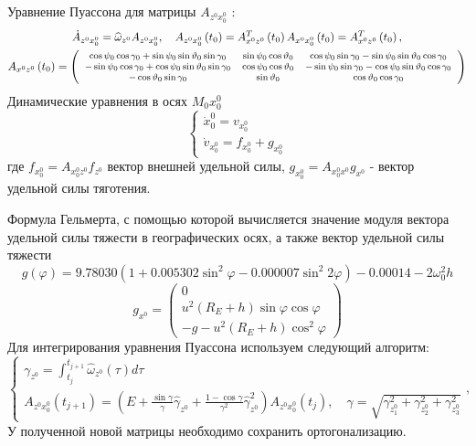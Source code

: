 \documentclass[a4paper,14pt]{article}
\theoremstyle{plain} %
\theoremstyle{definition} %
\theoremstyle{remark} %
\begin{document}
{Уравнение Пуассона для матрицы $A_{z^{0} x_{0}^{0}}$ :
$$
    \begin{gathered}
        \dot{A}_{z^{0} x_{0}^{0}}=\widehat{\omega}_{z^{0}} A_{z^{0} x_{0}^{0}}, \quad A_{z^{0} x_{0}^{0}}\left(t_{0}\right)=A^{T}_{x^{0} z^{0}}\left(t_{0}\right) A_{x^{0} x_{0}^{0}}\left(t_{0}\right)=A^{T}_{x^{0} z^{0}}\left(t_{0}\right), \\
        {\footnotesize
        A_{x^{0} z^{0}}\left(t_{0}\right)=\left(\begin{array}{ccc}
                \cos \psi_{0} \cos \gamma_{0}+\sin \psi_{0} \sin \vartheta_{0} \sin \gamma_{0}  & \sin \psi_{0} \cos \vartheta_{0} & \cos \psi_{0} \sin \gamma_{0}-\sin \psi_{0} \sin \vartheta_{0} \cos \gamma_{0}  \\
                -\sin \psi_{0} \cos \gamma_{0}+\cos \psi_{0} \sin \vartheta_{0} \sin \gamma_{0} & \cos \psi_{0} \cos \vartheta_{0} & -\sin \psi_{0} \sin \gamma_{0}-\cos \psi_{0} \sin \vartheta_{0} \cos \gamma_{0} \\
                -\cos \vartheta_{0} \sin \gamma_{0}                                             & \sin \vartheta_{0}               & \cos \vartheta_{0} \cos \gamma_{0}
            \end{array}\right)
        }
    \end{gathered}
$$
Динамические уравнения в осях $M_0x_0^0$
$$
    \left\{\begin{array}{l}
        \dot{x}_{0}^{0}=v_{x_{0}^{0}} \\
        \dot{v}_{x_{0}^{0}}=f_{x_{0}^{0}}+g_{x_{0}^{0}}
    \end{array}\right.
$$
где $f_{x_{0}^{0}}=A_{x_{0}^{0} z^{0}} f_{z^{0}}$ вектор внешней удельной силы, $g_{x_{0}^{0}}=A_{x_{0}^{0} x^{0}} g_{x^{0}}$ - вектор удельной силы тяготения.

Формула Гельмерта, с помощью которой вычисляется значение модуля вектора удельной силы тяжести в географических осях, а также вектор удельной силы тяжести
$$
    g(\varphi)=9.78030\left(1+0.005302 \sin ^{2} \varphi-0.000007 \sin ^{2} 2 \varphi\right)-0.00014-2 \omega_{0}^{2} h
$$
$$
    g_{x^{0}}=\left(\begin{array}{c}
            0                                                   \\
            u^{2}\left(R_{E}+h\right) \sin \varphi \cos \varphi \\
            -g-u^{2}\left(R_{E}+h\right) \cos ^{2} \varphi
        \end{array}\right)
$$
Для интегрирования уравнения Пуассона используем следующий алгоритм:
$$
    \left\{\begin{array}{l}
        \gamma_{z^{0}}=\int_{t_{j}}^{t_{j+1}} \widehat{\omega}_{z^{0}}(\tau) d \tau \\
        A_{z^{0} x_{0}^{0}}\left(t_{j+1}\right)=\left(E+\frac{\sin \gamma}{\gamma} \widehat{\gamma}_{z^{0}}+\frac{1-\cos \gamma}{\gamma^{2}} \widehat{\gamma}_{z^{0}}^{2}\right) A_{z^{0} x_{0}^{0}}\left(t_{j}\right), \quad \gamma=\sqrt{\gamma_{z_{1}^{0}}^{2}+\gamma_{z_{2}^{0}}^{2}+\gamma_{z_{3}^{0}}^{2}}
    \end{array},\right.
$$
У полученной новой матрицы необходимо сохранить ортогонализацию.

}
\end{document}
